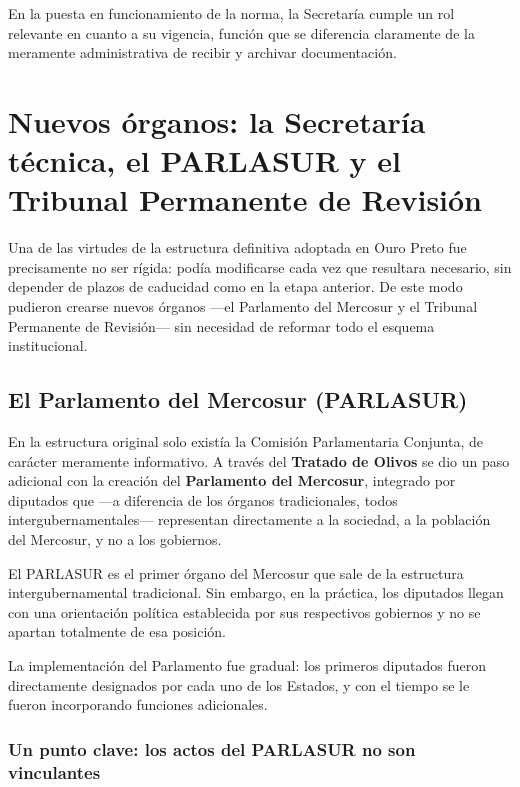 \documentclass[12pt,oneside]{book}
\begin{document}
\begin{important}
En la puesta en funcionamiento de la norma, la Secretaría cumple un rol relevante en cuanto a su vigencia, función que se diferencia claramente de la meramente administrativa de recibir y archivar documentación.
\end{important}

\section{Nuevos órganos: la Secretaría técnica, el PARLASUR y el Tribunal Permanente de Revisión}

Una de las virtudes de la estructura definitiva adoptada en Ouro Preto fue precisamente no ser rígida: podía modificarse cada vez que resultara necesario, sin depender de plazos de caducidad como en la etapa anterior. De este modo pudieron crearse nuevos órganos —el Parlamento del Mercosur y el Tribunal Permanente de Revisión— sin necesidad de reformar todo el esquema institucional.

\subsection{El Parlamento del Mercosur (PARLASUR)}

En la estructura original solo existía la Comisión Parlamentaria Conjunta, de carácter meramente informativo. A través del \textbf{Tratado de Olivos} se dio un paso adicional con la creación del \textbf{Parlamento del Mercosur}, integrado por diputados que —a diferencia de los órganos tradicionales, todos intergubernamentales— representan directamente a la sociedad, a la población del Mercosur, y no a los gobiernos.

\begin{important}
El PARLASUR es el primer órgano del Mercosur que sale de la estructura intergubernamental tradicional. Sin embargo, en la práctica, los diputados llegan con una orientación política establecida por sus respectivos gobiernos y no se apartan totalmente de esa posición.
\end{important}

La implementación del Parlamento fue gradual: los primeros diputados fueron directamente designados por cada uno de los Estados, y con el tiempo se le fueron incorporando funciones adicionales.

\subsubsection{Un punto clave: los actos del PARLASUR no son vinculantes}
\end{document}
